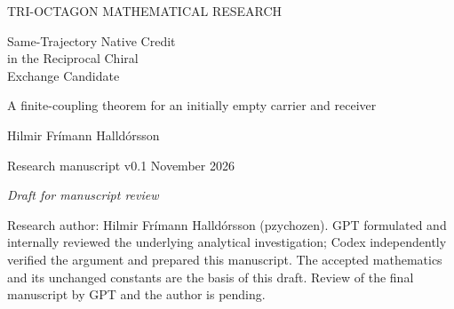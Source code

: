 \documentclass[11pt,a4paper]{article}
\numberwithin{equation}{section}
\begin{document}
\hypersetup{pageanchor=false}
\begin{titlepage}
\vspace*{5mm}
{\small\color{MidnightBlue} TRI-OCTAGON MATHEMATICAL RESEARCH\par}
\vspace{8mm}
{\LARGE\bfseries\raggedright Same-Trajectory Native Credit\\
in the Reciprocal Chiral\\Exchange Candidate\par}
\vspace{6mm}
{\large A finite-coupling theorem for an initially empty carrier and receiver\par}
\vspace{7mm}
{\large Hilmir Fr\'imann Halld\'orsson\par}
\vspace{3mm}
{Research manuscript v0.1 November 2026\par}
{\itshape Draft for manuscript review\par}
\vspace{5mm}
\begin{abstract}
The reciprocal chiral exchange candidate for the Tri-Octagon model couples a native state to a periodic carrier and a reversible receiver through two finite distributed profiles. Its earlier analysis established initial supply from an empty carrier and receiver, and native credit from separately prepared states. We prove a sufficient finite-coupling theorem that connects these signs on one unchanged solution. Fix the admissible geometry, positive storage scales and native coupling, and a launch from the specified coherent family with nonzero chiral drive. An explicit finite receiver-coupling threshold ensures initial positive total native power and receiver charging, followed by strictly negative total native-to-carrier power at a specified later time. The proof uses exact time and state scaling, a weighted external-energy estimate, and an oscillator comparison whose propagation and native-drift errors are bounded at finite coupling. Only first weak derivatives of the tent profiles are required. Continuity supplies a later interval of positive native-storage recovery without resetting the state or changing coefficients. Cumulative native debit remains nonnegative, and the coherent-core invariant ceiling persists. The result establishes a behavior of the published candidate, with a dynamically active receiver; it does not classify all positive couplings or establish a substantial recovered fraction. The witness describes fast collocated exchange rather than a completed spatial circuit or calibrated physical energy transport.
\end{abstract}
\vfill
{\small Research author: Hilmir Fr\'imann Halld\'orsson (pzychozen).
GPT formulated and internally reviewed the underlying analytical investigation;
Codex independently verified the argument and prepared this manuscript.
The accepted mathematics and its unchanged constants are the basis of this draft.
Review of the final manuscript by GPT and the author is pending.}
\end{titlepage}
\setcounter{page}{2}\hypersetup{pageanchor=true}







\appendix


\end{document}
